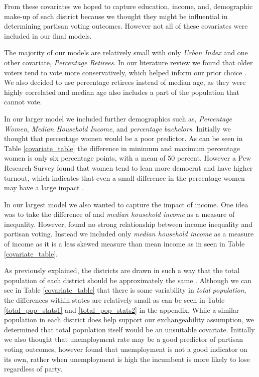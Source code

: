 \documentclass[12pt]{article}
\newcommand{\red}[1]{\textcolor{red}{#1}}
\newcommand{\blue}[1]{\textcolor{blue}{#1}}
\begin{document}
From these covariates we hoped to capture education, income, and, demographic make-up of each district because we thought they might be influential in determining partisan voting outcomes. However not all of these covariates were included in our final models. 

The majority of our models are relatively small with only \textit{Urban Index} and one other covariate, \textit{Percentage Retirees}. In our literature review we found that older voters tend to vote more conservatively, which helped inform our prior choice \parencite{brown2022oldvoters}.  We also decided to use percentage retirees instead of median age, as they were highly correlated and median age also includes a part of the population that cannot vote. 

In our larger model we included further demographics such as, \textit{Percentage Women}, \textit{Median Household Income}, and \textit{percentage bachelors}. Initially we thought that percentage women would be a poor predictor. As can be seen in Table \ref{covariate_table} the difference in minimum and maximum percentage women is only six percentage points, with a mean of 50 percent. However a Pew Research Survey found that women tend to lean more democrat and have higher turnout, which indicates that even a small difference in the percentage women may have a large impact \parencite{pew2020}. 

In our largest model we also wanted to capture the impact of income. One idea was to take the difference of  and \textit{median household income} as a measure of inequality. However, \cite{gelman2010income} found no strong relationship between income inequality and partisan voting. Instead we included only \textit{median household income} as a measure of income as it is a less skewed measure than mean income as in seen in Table \ref{covariate_table}.


As previously explained, the districts are drawn in such a way that the total population of each district should be approximately the same \parencite{us_elections}. Although we can see in Table \ref{covariate_table} that there is some variability in \textit{total population}, the differences within states are relatively small as can be seen in Table \ref{total_pop_stats1} and \ref{total_pop_stats2} in the appendix. While a similar population in each district does help support our exchangeability assumption, we determined that total population itself would be an unsuitable covariate. Initially we also thought that unemployment rate may be a good predictor of partisan voting outcomes, however \cite{park2020unemployment} found that unemployment is not a good indicator on its own, rather when unemployment is high the incumbent is more likely to lose regardless of party\parencite{park2020unemployment}. 
\end{document}
